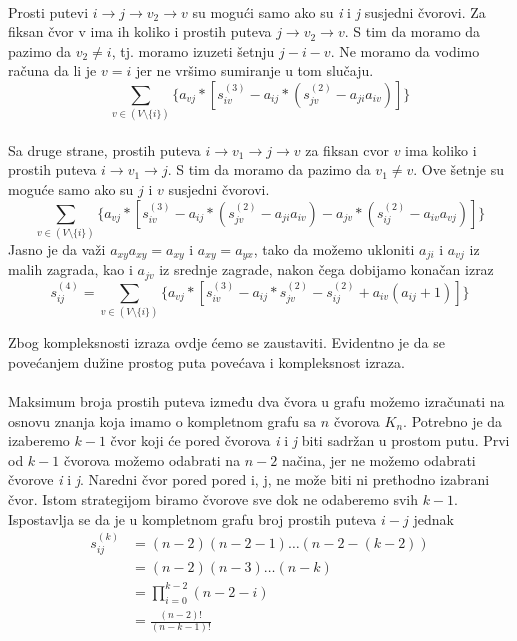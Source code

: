 \documentclass[11pt]{article}
\begin{document}
			\paragraph{}
			Prosti putevi $i \rightarrow j \rightarrow v_2 \rightarrow v$ su mogući samo ako su \emph{i} i \emph{j} susjedni čvorovi. Za fiksan čvor v ima ih koliko i prostih puteva $j \rightarrow v_2 \rightarrow v$. 
			S tim da moramo da pazimo da $v_2 \neq i$, tj. moramo izuzeti šetnju $j-i-v$. Ne moramo da vodimo računa da li je $v=i$ jer ne vršimo sumiranje u tom slučaju.
			\[
				\sum_{v \in (V \setminus \{i\})} \{a_{vj} * [s_{iv}^{(3)} - a_{ij} * (s_{jv}^{(2)} - a_{ji}a_{iv})]\}
			\]
		
			\paragraph{}
			Sa druge strane, prostih puteva $i \rightarrow v_1 \rightarrow j \rightarrow v$ za fiksan cvor $v$ ima koliko i prostih puteva $i \rightarrow v_1 \rightarrow j$. 
			S tim da moramo da pazimo da $v_1 \neq v$. Ove šetnje su moguće samo ako su $j$ i $v$ susjedni čvorovi.
			\[
				\sum_{v \in (V \setminus \{i\})} \{a_{vj} * [s_{iv}^{(3)} - a_{ij} * (s_{jv}^{(2)} - a_{ji}a_{iv}) - a_{jv} * (s_{ij}^{(2)} -  a_{iv}a_{vj})]\}
			\]
			Jasno je da važi $a_{xy}a_{xy}=a_{xy}$ i $a_{xy}=a_{yx}$, tako da možemo ukloniti $a_{ji}$ i $a_{vj}$ iz malih zagrada, kao i $a_{jv}$ iz srednje zagrade, nakon čega dobijamo konačan izraz
			 \[
				s_{ij}^{(4)} = \sum_{v \in (V \setminus \{i\})} \{a_{vj} * [s_{iv}^{(3)} - a_{ij} * s_{jv}^{(2)} - s_{ij}^{(2)} +  a_{iv}( a_{ij} + 1)]\}
			 \]

			Zbog kompleksnosti izraza ovdje ćemo se zaustaviti. Evidentno je da se povećanjem dužine prostog puta povećava i kompleksnost izraza.
		
			\paragraph{}
			Maksimum broja prostih puteva između dva čvora u grafu možemo izračunati na osnovu znanja koja imamo o kompletnom grafu sa $n$ čvorova $K_n$.
			Potrebno je da izaberemo $k-1$ čvor koji će pored čvorova \emph{i} i \emph{j} biti sadržan u prostom putu. Prvi od $k-1$ čvorova možemo odabrati na $n-2$ načina, 
			jer ne možemo odabrati čvorove \emph{i} i \emph{j}. Naredni čvor pored pored i, j, ne može biti ni prethodno izabrani čvor. Istom strategijom biramo čvorove sve dok ne odaberemo svih $k-1$. 
			Ispostavlja se da je u kompletnom grafu broj prostih puteva $i-j$ jednak 
			\[
				\begin{split}
				s_{ij}^{(k)} & = (n-2)(n-2-1) \dots (n-2-(k-2)) \\
				                  & = (n-2)(n-3) \dots (n-k) \\
				                  & = \prod_{i=0}^{k-2} (n-2-i) \\ 
				                  & = \frac{(n-2)!}{(n-k-1)!}
				\end{split}
			\]
		
\end{document}
